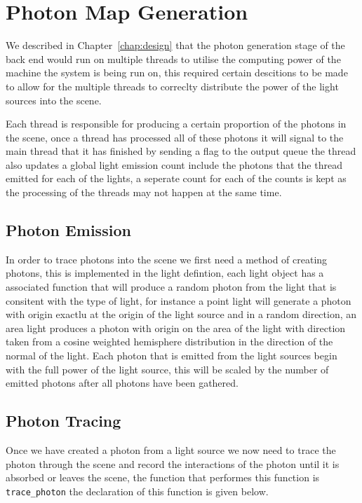 \section{Photon Map Generation}
We described in Chapter~\ref{chap:design} that the photon generation stage of the back end would run on multiple threads
to utilise the computing power of the machine the system is being run on, this required certain descitions to be made to
allow for the multiple threads to correclty distribute the power of the light sources into the scene.

Each thread is responsible for producing a certain proportion of the photons in the scene, once a thread has processed all
of these photons it will signal to the main thread that it has finished by sending a flag to the output queue the thread also
updates a global light emission count include the photons that the thread emitted for each of the lights, a seperate count for
each of the counts is kept as the processing of the threads may not happen at the same time.


\subsection{Photon Emission}
In order to trace photons into the scene we first need a method of creating photons, this is implemented in the light 
defintion, each light object has a associated function that will produce a random photon from the light that is consitent with 
the type of light, for instance a point light will generate a photon with origin exactlu at the origin of the light source and
in a random direction, an area light produces a photon with origin on the area of the light with direction taken from a
cosine weighted hemisphere distribution in the direction of the normal of the light. Each photon that is emitted from the
light sources begin with the full power of the light source, this will be scaled by the number of emitted photons after
all photons have been gathered.

\subsection{Photon Tracing}
Once we have created a photon from a light source we now need to trace the photon through the scene and record the interactions
of the photon until it is absorbed or leaves the scene, the function that performes this function is \texttt{trace\_photon} the
declaration of this function is given below.

